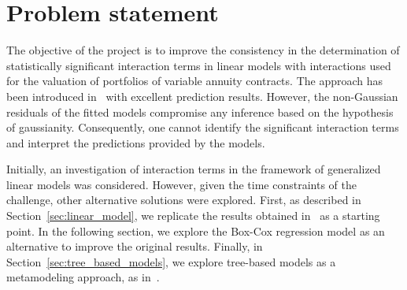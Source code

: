 \section{Problem statement}



The objective of the project is to improve the consistency in the determination of statistically significant interaction terms in linear models with interactions used for the valuation of portfolios of variable annuity contracts. The approach has been introduced in~\cite{gan2018regression} with excellent prediction results. However, the non-Gaussian residuals of the fitted models compromise any inference based on the hypothesis of gaussianity. Consequently, one cannot identify the significant interaction terms and interpret the predictions provided by the models.

Initially, an investigation of interaction terms in the framework of generalized linear models was considered. However, given the time constraints of the challenge, other alternative solutions were explored. First, as described in Section~\ref{sec:linear_model}, we replicate the results obtained in~\cite{gan2018regression} as a starting point. In the following section, we explore the Box-Cox regression model as an alternative to improve the original results. Finally, in Section~\ref{sec:tree_based_models}, we explore tree-based models as a metamodeling approach, as in~\cite{quan2018tree}.

